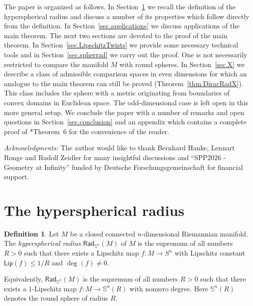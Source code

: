 \documentclass[11pt,reqno]{amsart}
\newcommand{\RadSn}{\mathsf{Rad}_{\Sn}}
\newcommand{\Lip}{\mathsf{Lip}}
\newcommand{\Sn}{\mathbb{S}^n}
\newcommand{\<}{\langle}
\renewcommand{\>}{\rangle}
\theoremstyle{definition}
\newtheorem{definition}{Definition}
\begin{document}
The paper is organized as follows.
In Section~\ref{sec.HypersphericalRadius} we recall the definition of the hyperspherical radius and discuss a number of its properties which follow directly from the definition.
In Section~\ref{sec.applications} we discuss applications of the main theorem.
The next two sections are devoted to the proof of the main theorem.
In Section~\ref{sec.LipschitzTwists} we provide some necessary technical tools and in Section~\ref{sec.spherrad} we carry out the proof.
One is not necessarily restricted to compare the manifold $M$ with round spheres.
In Section~\ref{sec.X} we describe a class of admissible comparison spaces in even dimensions for which an analogue to the main theorem can still be proved (Theorem~\ref{thm.DiracRadX}).
This class includes the sphere with a metric originating from boundaries of convex domains in Euclidean space.
The odd-dimensional case is left open in this more general setup.
We conclude the paper with a number of remarks and open questions in Section~\ref{sec.conclusion} and an appendix which contains a complete proof of \cite{HMZ}*{Theorem~6} for the convenience of the reader.

\medskip

\textit{Acknowledgments:} 
The author would like to thank Bernhard Hanke, Lennart Ronge and Rudolf Zeidler for many insightful discussions and ``SPP2026 - Geometry at Infinity'' funded by Deutsche Forschungsgemeinschaft for financial support.

\section{The hyperspherical radius}
\label{sec.HypersphericalRadius}

\begin{definition}\label{def.hyprad}
Let $M$ be a closed connected $n$-dimensional Riemannian manifold.
The \emph{hyperspherical radius} $\RadSn(M)$ of $M$ is the supremum of all numbers $R>0$ such that there exists a Lipschitz map $f\colon M\to S^n$ with Lipschitz constant $\Lip(f)\le 1/R$ and $\deg(f)\ne0$.
\end{definition}

Equivalently, $\RadSn(M)$ is the supremum of all numbers $R>0$ such that there exists a $1$-Lipschitz map $f\colon M\to \Sn(R)$ with nonzero degree.
Here $\Sn(R)$ denotes the round sphere of radius $R$.
\end{document}
